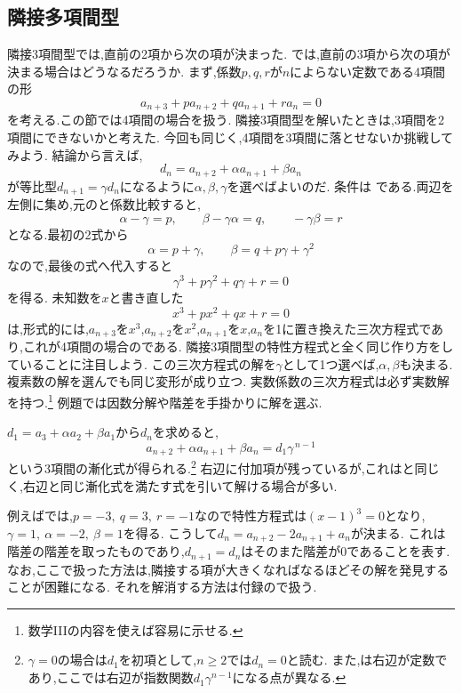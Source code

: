 \subsection{隣接多項間型}\label{節：隣接多項型}
隣接3項間型では,直前の2項から次の項が決まった.
では,直前の3項から次の項が決まる場合はどうなるだろうか.
まず,係数$p,q,r$が$n$によらない定数である4項間の形
\[
  a_{n+3}+pa_{n+2}+qa_{n+1}+ra_n=0
\]
を考える.この節では4項間の場合を扱う.
隣接3項間型を解いたときは,3項間を2項間にできないかと考えた.
今回も同じく,4項間を3項間に落とせないか挑戦してみよう.
結論から言えば,
\[
  d_n=a_{n+2}+\alpha a_{n+1}+\beta a_n
\]
が等比型$d_{n+1}=\gamma d_n$になるように$\alpha,\beta,\gamma$を選べばよいのだ.
条件は
\BookMathLayout{\[
    a_{n+3}+\alpha a_{n+2}+\beta a_{n+1}=\gamma \left(a_{n+2}+\alpha a_{n+1}+\beta a_{n}\right)
  \]}{
  \[
    \begin{aligned}
      a_{n+3}+\alpha a_{n+2}+\beta a_{n+1}\\
      {}=\gamma\left(a_{n+2}+\alpha a_{n+1}+\beta a_n\right)
    \end{aligned}
  \]
}
である.両辺を左側に集め,元のと係数比較すると,
\[
  \alpha-\gamma=p,\qquad
  \beta-\gamma\alpha=q,\qquad
  -\gamma\beta=r
\]
となる.最初の2式から
\[
  \alpha=p+\gamma,\qquad
  \beta=q+p\gamma+\gamma^2
\]
なので,最後の式へ代入すると
\[
  \gamma^3+p\gamma^2+q\gamma+r=0
\]
を得る.
未知数を$x$と書き直した
\[
  x^3+px^2+qx+r=0
\]
は,形式的には,$a_{n+3}$を$x^3$,$a_{n+2}$を$x^2$,$a_{n+1}$を$x$,$a_n$を1に置き換えた三次方程式であり,これが4項間の場合のである.
隣接3項間型の特性方程式と全く同じ作り方をしていることに注目しよう.
この三次方程式の解を$\gamma$として1つ選べば,$\alpha,\beta$も決まる.複素数の解を選んでも同じ変形が成り立つ.
実数係数の三次方程式は必ず実数解を持つ.\footnote{数学IIIの内容を使えば容易に示せる.}
例題では因数分解や階差を手掛かりに解を選ぶ.

$d_1=a_3+\alpha a_2+\beta a_1$から$d_n$を求めると,
\[
  a_{n+2}+\alpha a_{n+1}+\beta a_n=d_1\gamma^{\,n-1}
\]
という3項間の漸化式が得られる.\footnote{$\gamma=0$の場合は$d_1$を初項として,$n\ge2$では$d_n=0$と読む.
  また,は右辺が定数であり,ここでは右辺が指数関数$d_1\gamma^{n-1}$になる点が異なる.}
右辺に付加項が残っているが,これはと同じく,右辺と同じ漸化式を満たす式を引いて解ける場合が多い.

例えばでは,$p=-3,\ q=3,\ r=-1$なので特性方程式は$(x-1)^3=0$となり,
$\gamma=1,\ \alpha=-2,\ \beta=1$を得る.
こうして$d_n=a_{n+2}-2a_{n+1}+a_n$が決まる.
これは階差の階差を取ったものであり,$d_{n+1}=d_n$はそのまた階差が0であることを表す.
なお,ここで扱った方法は,隣接する項が大きくなればなるほどその解を発見することが困難になる.
それを解消する方法は付録ので扱う.


